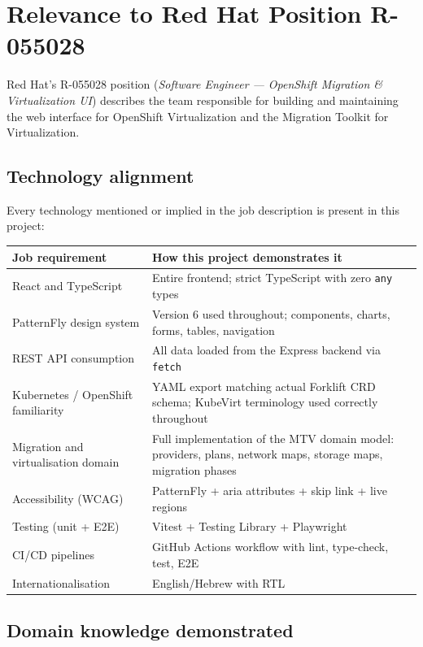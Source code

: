 \documentclass[12pt,a4paper]{article}
\begin{document}
\section{Relevance to Red Hat Position R-055028}
\label{sec:job}

Red Hat's R-055028 position (\textit{Software Engineer — OpenShift Migration \& Virtualization UI}) describes the team responsible for building and maintaining the web interface for OpenShift Virtualization and the Migration Toolkit for Virtualization.

\subsection{Technology alignment}

Every technology mentioned or implied in the job description is present in this project:

\begin{longtable}{L{5.5cm} L{8.5cm}}
  \toprule
  \textbf{Job requirement} & \textbf{How this project demonstrates it} \\
  \midrule
  \endhead
  React and TypeScript       & Entire frontend; strict TypeScript with zero \texttt{any} types \\
  PatternFly design system   & Version 6 used throughout; components, charts, forms, tables, navigation \\
  REST API consumption       & All data loaded from the Express backend via \texttt{fetch} \\
  Kubernetes / OpenShift familiarity & YAML export matching actual Forklift CRD schema; KubeVirt terminology used correctly throughout \\
  Migration and virtualisation domain & Full implementation of the MTV domain model: providers, plans, network maps, storage maps, migration phases \\
  Accessibility (WCAG)       & PatternFly + aria attributes + skip link + live regions \\
  Testing (unit + E2E)       & Vitest + Testing Library + Playwright \\
  CI/CD pipelines            & GitHub Actions workflow with lint, type-check, test, E2E \\
  Internationalisation       & English/Hebrew with RTL \\
  \bottomrule
\end{longtable}

\subsection{Domain knowledge demonstrated}
\end{document}
